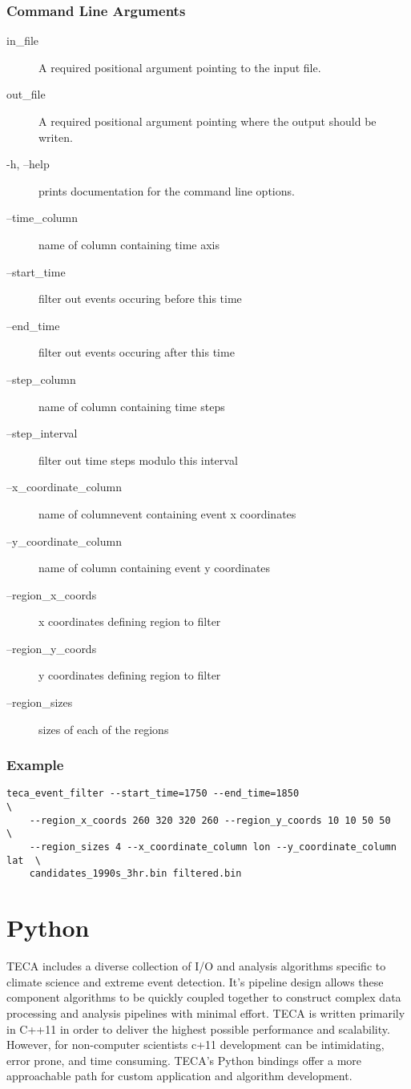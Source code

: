 \documentclass[a4paper,10pt,DIV=12]{scrreprt}
\begin{document}
\subsection{Command Line Arguments}
\begin{description}
\item[in\_file] A required positional argument pointing to the input file.
\item[out\_file] A required positional argument pointing where the output should be writen.
\item[-h, --help] prints documentation for the command line options.
\item[--time\_column] name of column containing time axis
\item[--start\_time] filter out events occuring before this time
\item[--end\_time] filter out events occuring after this time
\item[--step\_column] name of column containing time steps
\item[--step\_interval] filter out time steps modulo this interval
\item[--x\_coordinate\_column] name of columnevent containing event x coordinates
\item[--y\_coordinate\_column] name of column containing event y coordinates
\item[--region\_x\_coords] x coordinates defining region to filter
\item[--region\_y\_coords] y coordinates defining region to filter
\item[--region\_sizes] sizes of each of the regions
\end{description}

\subsection{Example}
\begin{verbatim}
teca_event_filter --start_time=1750 --end_time=1850                       \
    --region_x_coords 260 320 320 260 --region_y_coords 10 10 50 50       \
    --region_sizes 4 --x_coordinate_column lon --y_coordinate_column lat  \
    candidates_1990s_3hr.bin filtered.bin
\end{verbatim}

\chapter{Python}
TECA includes a diverse collection of I/O and analysis algorithms specific to climate science and extreme event detection. It's pipeline design allows these component algorithms to be quickly coupled together to construct complex data processing and analysis pipelines with minimal effort. TECA is written primarily in C++11 in order to deliver the highest possible performance and scalability. However, for non-computer scientists c+11 development can be intimidating, error prone, and time consuming. TECA's Python bindings offer a more approachable path for custom application and algorithm development.
\end{document}
